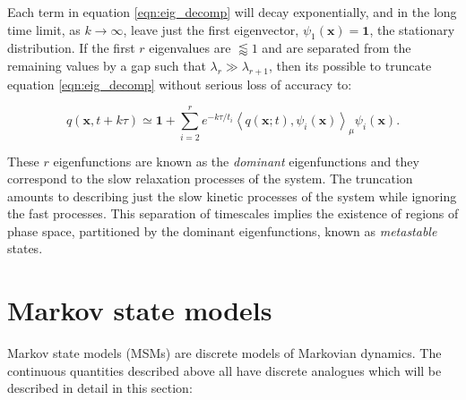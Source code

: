 Each term in equation \ref{eqn:eig_decomp} will decay exponentially, and in the long time limit, as $k \rightarrow \infty$, leave just the first eigenvector, $\psi_{1}(\mathbf{x})=\mathbf{1}$, the stationary distribution. If the first $r$ eigenvalues are $\lessapprox 1$ and are separated from the remaining values by a gap such that $\lambda_{r} \gg \lambda_{r+1}$, then its possible to truncate equation \ref{eqn:eig_decomp} without serious loss of accuracy to:

\begin{equation}\label{eqn:eig_decomp_to_r}
q(\mathbf{x},  t+k \tau)  \simeq \mathbf{1}+\sum_{i=2}^{r} e^{-k \tau / t_{i}}\left\langle q(\mathbf{x} ; t), \psi_{i}(\mathbf{x})\right\rangle_{\mu} \psi_{i}(\mathbf{x}).
\end{equation}

These $r$ eigenfunctions are known as the \emph{dominant} eigenfunctions and they correspond to the slow relaxation processes of the system.\cite{prinzMarkovModelsMolecular2011} The truncation amounts to describing just the slow kinetic processes of the system while ignoring the fast processes. This separation of timescales implies the existence of regions of phase space, partitioned by the dominant eigenfunctions, known as \emph{metastable} states. \cite{prinzMarkovModelsMolecular2011} 

\section{Markov state models}\label{sec:theory_msm}

Markov state models (MSMs) are discrete models of Markovian dynamics.\cite{prinzMarkovModelsMolecular2011} The continuous quantities described above all have discrete analogues which will be described in detail in this section: 

